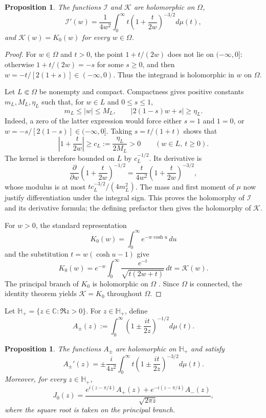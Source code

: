 \documentclass[11pt]{amsart}
\numberwithin{equation}{section}
\newtheorem{proposition}[theorem]{Proposition}
\theoremstyle{definition}
\theoremstyle{remark}
\newcommand{\C}{\mathbb C}
\newcommand{\Hplus}{\mathbb H_+}
\begin{document}
\begin{proposition}\label{prop:K-Laplace}
The functions $\mathcal I$ and $\mathcal K$ are holomorphic on $\Omega$,
\[
   \mathcal I'(w)=\frac{1}{4w^2}\int_0^\infty
   t\left(1+\frac{t}{2w}\right)^{-3/2}d\mu(t),
\]
and $\mathcal K(w)=K_0(w)$ for every $w\in\Omega$.
\end{proposition}

\begin{proof}
For $w\in\Omega$ and $t>0$, the point $1+t/(2w)$ does not lie on
$(-\infty,0]$: otherwise $1+t/(2w)=-s$ for some $s\ge0$, and then
$w=-t/[2(1+s)]\in(-\infty,0)$.  Thus the integrand is holomorphic in $w$ on
$\Omega$.

Let $L\Subset\Omega$ be nonempty and compact.  Compactness gives positive
constants $m_L,M_L,\eta_L$ such that, for $w\in L$ and $0\le s\le1$,
\[
   m_L\le |w|\le M_L,
   \qquad |2(1-s)w+s|\ge\eta_L.
\]
Indeed, a zero of the latter expression would force either $s=1$ and
$1=0$, or $w=-s/[2(1-s)]\in(-\infty,0]$.  Taking $s=t/(1+t)$ shows that
\[
   \left|1+\frac{t}{2w}\right|\ge c_L:=\frac{\eta_L}{2M_L}>0
   \qquad(w\in L,\ t\ge0).
\]
The kernel is therefore bounded on $L$ by $c_L^{-1/2}$.  Its derivative is
\[
   \frac{\partial}{\partial w}
   \left(1+\frac{t}{2w}\right)^{-1/2}
   =\frac{t}{4w^2}\left(1+\frac{t}{2w}\right)^{-3/2},
\]
whose modulus is at most $t c_L^{-3/2}/(4m_L^2)$.  The mass and first
moment of $\mu$ now justify differentiation under the integral sign.
This proves the holomorphy of $\mathcal I$ and its derivative formula;
the defining prefactor then gives the holomorphy of $\mathcal K$.

For $w>0$, the standard representation \cite[10.32.9]{DLMF}
\[
   K_0(w)=\int_0^\infty e^{-w\cosh u}\,du
\]
and the substitution $t=w(\cosh u-1)$ give
\[
   K_0(w)=e^{-w}\int_0^\infty
   \frac{e^{-t}}{\sqrt{t(2w+t)}}\,dt=\mathcal K(w).
\]
The principal branch of $K_0$ is holomorphic on $\Omega$
\cite[Sec.~10.25(ii)]{DLMF}.  Since $\Omega$ is connected, the identity
theorem yields $\mathcal K=K_0$ throughout $\Omega$.
\end{proof}

Let $\Hplus=\{z\in\C:\Re z>0\}$.  For $z\in\Hplus$, define
\begin{equation*}
   A_\pm(z):=\int_0^\infty
   \left(1\pm\frac{it}{2z}\right)^{-1/2}d\mu(t).
\end{equation*}

\begin{proposition}\label{prop:exact-decomposition}
The functions $A_\pm$ are holomorphic on $\Hplus$ and satisfy
\begin{equation}\label{eq:Apm-derivative}
   A_\pm'(z)=\pm\frac{i}{4z^2}\int_0^\infty
   t\left(1\pm\frac{it}{2z}\right)^{-3/2}d\mu(t).
\end{equation}
Moreover, for every $z\in\Hplus$,
\begin{equation}\label{eq:exact-J0-decomposition}
   J_0(z)=\frac{e^{i(z-\pi/4)}A_+(z)+e^{-i(z-\pi/4)}A_-(z)}
   {\sqrt{2\pi z}},
\end{equation}
where the square root is taken on the principal branch.
\end{proposition}
\end{document}
